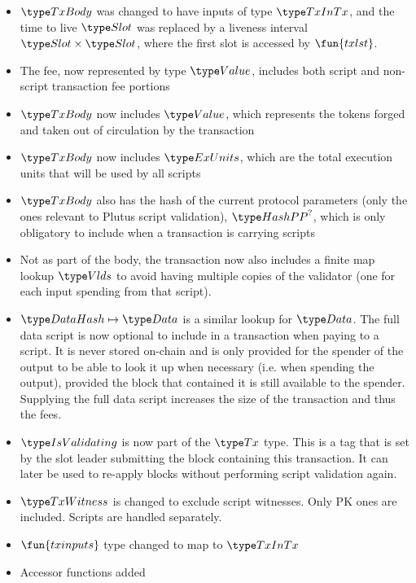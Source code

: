 \begin{itemize}
  \item $\TxBody$ was changed to have inputs of type $\TxInTx$, and the
  time to live $\Slot$ was replaced by a liveness interval $\Slot \times \Slot$,
  where the first slot is accessed by $\fun{txlst}$.
  \item The fee, now represented by type $\Value$, includes both script and
  non-script transaction fee portions
  \item $\TxBody$ now includes $\Value$, which represents
  the tokens forged and taken out of circulation by the transaction
  \item $\TxBody$ now includes $\ExUnits$, which are the total execution units
  that will be used by all scripts
  \item $\TxBody$ also has the hash of the current protocol parameters
  (only the ones relevant to Plutus script validation), $\HashPP^?$,
  which is only obligatory to include when a transaction is carrying scripts
  \item Not as part of the body, the transaction now also includes
  a finite map lookup $\Vlds$ to avoid having multiple
  copies of the validator (one for each input spending from that script).
  \item $\HashDat \mapsto \Data$ is a similar lookup for $\Data$.
  The full data script is now optional to include in a transaction when
  paying to a script. It is never
  stored on-chain and is only provided for the spender of the output
  to be able to look it up when necessary (i.e. when spending the output),
  provided the block that contained it is still available to the spender.
  Supplying the full data script increases the size of the transaction and
  thus the fees.
  \item $\IsValidating$ is now part of the $\Tx$ type. This is a tag that is
  set by the slot leader submitting the block containing this transaction.
  It can later be used to re-apply blocks without performing script validation
  again.
  \item $\TxWitness$ is changed to exclude script witnesses. Only PK ones
  are included. Scripts are handled separately.
  \item $\fun{txinputs}$ type changed to map to $\TxInTx$
  \item Accessor functions added
\end{itemize}



